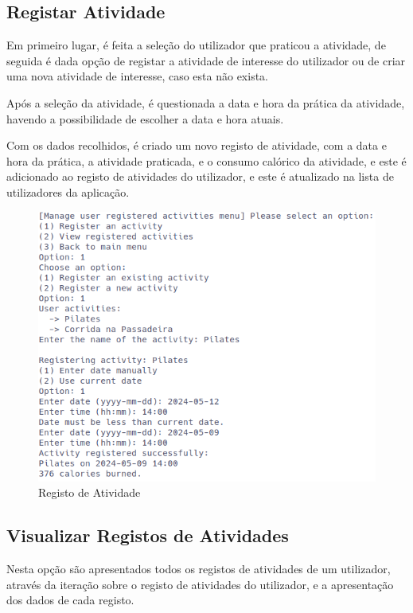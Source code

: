 \documentclass[a4paper,12pt]{scrreprt}
\begin{document}
    \clearpage
    \subsection{Registar Atividade}
    Em primeiro lugar, é feita a seleção do utilizador que praticou a atividade,
    de seguida é dada opção de registar a atividade de interesse do utilizador ou
    de criar uma nova atividade de interesse, caso esta não exista.

    Após a seleção da atividade, é questionada a data e hora da prática da atividade,
    havendo a possibilidade de escolher a data e hora atuais.

    Com os dados recolhidos, é criado um novo registo de atividade, com a data e hora da prática,
    a atividade praticada, e o consumo calórico da atividade, e este é adicionado ao registo de atividades do utilizador,
    e este é atualizado na lista de utilizadores da aplicação.

    \begin{figure}[!ht]
        \centering
        \includegraphics[width=\textwidth]{images/registerActivity.png}
        \caption{Registo de Atividade}
        \label{fig:register-activity}
    \end{figure}

    \clearpage
    \subsection{Visualizar Registos de Atividades}
    Nesta opção são apresentados todos os registos de atividades de um utilizador,
    através da iteração sobre o registo de atividades do utilizador,
    e a apresentação dos dados de cada registo.
\end{document}
